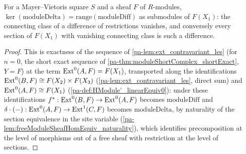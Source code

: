 \begin{lemma}[Exactness at \(F(X_1)\)]
  \label{pa-lem:mv_exact_at_X1}
  \leanok

  For a Mayer--Vietoris square \(S\) and a sheaf \(F\) of \(R\)-modules,
  \(\ker(\mathrm{moduleDelta}) = \mathrm{range}(\mathrm{moduleDiff})\) as submodules of
  \(F(X_1)\): the connecting class of a difference of restrictions vanishes, and conversely
  every section of \(F(X_1)\) with vanishing connecting class is such a difference.
\end{lemma}
\begin{proof}
  \leanok
  This is exactness of the sequence of \ref{pa-lem:ext_contravariant_les} (for \(n=0\), the
  short exact sequence of \ref{pa-thm:moduleShortComplex_shortExact}, \(Y=F\)) at the term
  \(\operatorname{Ext}^0(A,F) = F(X_1)\), transported along the identifications
  \(\operatorname{Ext}^0(B,F) \cong F(X_2) \times F(X_3)\) (\ref{pa-lem:ext_contravariant_les}, direct sum) and
  \(\operatorname{Ext}^0(A,F) \cong F(X_1)\) (\ref{pa-def:HModule'_linearEquiv0}): under these identifications
  \(f^* : \operatorname{Ext}^0(B,F) \to \operatorname{Ext}^0(A,F)\) becomes \(\mathrm{moduleDiff}\) and
  \(\delta \cdot (-) : \operatorname{Ext}^0(A,F) \to \operatorname{Ext}^1(C,F)\) becomes \(\mathrm{moduleDelta}\), by
  naturality of the section equivalence in the site variable
  (\ref{pa-lem:freeModuleSheafHomEquiv_naturality}), which identifies precomposition at the
  level of morphisms out of a free sheaf with restriction at the level of sections.
\end{proof}


